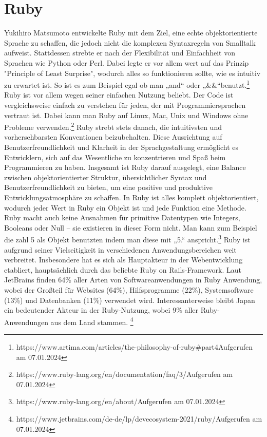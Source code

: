\documentclass{article}
\begin{document}
\section*{Ruby}


Yukihiro Matsumoto entwickelte Ruby mit dem Ziel, eine echte objektorientierte Sprache zu schaffen, die jedoch nicht die komplexen Syntaxregeln von Smalltalk aufweist. Stattdessen strebte er nach der Flexibilität und Einfachheit von Sprachen wie Python oder Perl. Dabei legte er vor allem wert auf das Prinzip "Principle of Least Surprise", wodurch alles so funktionieren sollte, wie es intuitiv zu erwartet ist. So ist es zum Beispiel egal ob man „and“ oder „\&\&“benutzt.\footnote{https://www.artima.com/articles/the-philosophy-of-ruby\#part4Aufgerufen am 07.01.2024}
Ruby ist vor allem wegen seiner einfachen Nutzung beliebt. Der Code ist vergleichsweise einfach zu verstehen für jeden, der mit Programmiersprachen vertraut ist. Dabei kann man Ruby auf Linux, Mac, Unix und Windows ohne Probleme verwenden.\footnote{https://www.ruby-lang.org/en/documentation/faq/3/Aufgerufen am 07.01.2024}
Ruby strebt stets danach, die intuitivsten und vorhersehbarsten Konventionen beizubehalten. Diese Ausrichtung auf Benutzerfreundlichkeit und Klarheit in der Sprachgestaltung ermöglicht es Entwicklern, sich auf das Wesentliche zu konzentrieren und Spaß beim Programmieren zu haben. Insgesamt ist Ruby darauf ausgelegt, eine Balance zwischen objektorientierter Struktur, übersichtlicher Syntax und Benutzerfreundlichkeit zu bieten, um eine positive und produktive Entwicklungsatmosphäre zu schaffen.
In Ruby ist alles komplett objektorientiert, wodurch jeder Wert in Ruby ein Objekt ist und jede Funktion eine Methode. Ruby macht auch keine Ausnahmen für primitive Datentypen wie Integers, Booleans oder Null – sie existieren in dieser Form nicht. Man kann zum Beispiel die zahl 5 als Objekt benutzten indem man diese mit „5.“ anspricht.\footnote{https://www.ruby-lang.org/en/about/Aufgerufen am 07.01.2024}
Ruby ist aufgrund seiner Vielseitigkeit in verschiedenen Anwendungsbereichen weit verbreitet. Insbesondere hat es sich als Hauptakteur in der Webentwicklung etabliert, hauptsächlich durch das beliebte Ruby on Rails-Framework. Laut JetBrains finden 64\% aller Arten von Softwareanwendungen in Ruby Anwendung, wobei der Großteil für Websites (64\%), Hilfsprogramme (22\%), Systemsoftware (13\%) und Datenbanken (11\%) verwendet wird.
Interessanterweise bleibt Japan ein bedeutender Akteur in der Ruby-Nutzung, wobei 9\% aller Ruby-Anwendungen aus dem Land stammen. \footnote{https://www.jetbrains.com/de-de/lp/devecosystem-2021/ruby/Aufgerufen am 07.01.2024}
\end{document}

